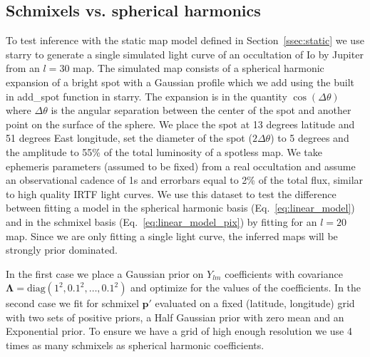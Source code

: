 \documentclass[modern]{aastex62}
\begin{document}
\subsection{Schmixels vs. spherical harmonics}
\label{ssec:schmixels_vs_harmonics}
To test inference with the static map model defined in Section~\ref{ssec:static} 
we use \textsf{starry} to generate a single simulated light curve of an occultation of Io by Jupiter from an $l=30$ map.
The simulated map consists of a spherical harmonic expansion of a bright spot with a Gaussian profile which we add using the built in \textsf{add\_spot} function in \textsf{starry}.
The expansion is in the quantity $\cos(\Delta\theta)$ where $\Delta\theta$ is the angular separation between the center of the spot and another point on the surface of the sphere. 
We place the spot at 13 degrees latitude and 51 degrees East longitude, set the diameter of the spot ($2\Delta\theta$) to 5 degrees and the amplitude to 55\% of the total luminosity of a spotless map.
We take ephemeris parameters (assumed to be fixed) from a real occultation and assume an observational cadence of 1s and errorbars equal to 2\% of the total flux, similar to high quality IRTF light curves.
We use this dataset to test the difference between fitting a model in the spherical harmonic basis (Eq.~\ref{eq:linear_model}) and in the schmixel basis (Eq.~\ref{eq:linear_model_pix})
by fitting for an $l=20$ map.
Since we are only fitting a single light curve, the inferred maps will be strongly prior dominated.

In the first case we place a Gaussian prior on $Y_{lm}$ coefficients with covariance $\boldsymbol{\Lambda}=\mathrm{diag}(1^2,0.1^2,\dots,0.1^2)$ and optimize for the values of the coefficients.
In the second case we fit for schmixel $\mathbf{p}'$ evaluated on a fixed (latitude, longitude) grid with two sets of positive priors, a Half Gaussian prior with zero mean and an Exponential prior.
To ensure we have a grid of high enough resolution we use 4 times as many schmixels as spherical harmonic coefficients.
\end{document}

